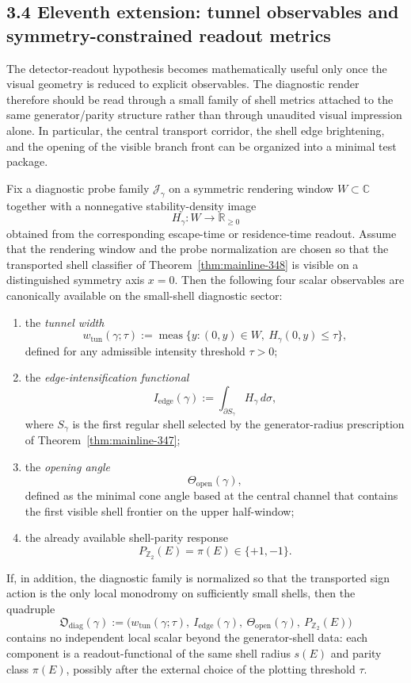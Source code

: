 \subsection*{3.4 Eleventh extension: tunnel observables and symmetry-constrained readout metrics}
The detector-readout hypothesis becomes mathematically useful only once the visual geometry is reduced to explicit observables. The diagnostic render therefore should be read through a small family of shell metrics attached to the same generator/parity structure rather than through unaudited visual impression alone. In particular, the central transport corridor, the shell edge brightening, and the opening of the visible branch front can be organized into a minimal test package.

\begin{proposition}
\label{prop:mainline-3410}
Fix a diagnostic probe family $\mathcal J_\gamma$ on a symmetric rendering window $W\subset\mathbb C$ together with a nonnegative stability-density image
\[
  H_\gamma:W\to\mathbb R_{\ge 0}
\]
obtained from the corresponding escape-time or residence-time readout. Assume that the rendering window and the probe normalization are chosen so that the transported shell classifier of Theorem~\ref{thm:mainline-348} is visible on a distinguished symmetry axis $x=0$. Then the following four scalar observables are canonically available on the small-shell diagnostic sector:
\begin{enumerate}[label=(\roman*)]
  \item the \emph{tunnel width}
  \[
    w_{\mathrm{tun}}(\gamma;\tau)
    :=\operatorname{meas}\bigl\{y:(0,y)\in W,\ H_\gamma(0,y)\le \tau\bigr\},
  \]
  defined for any admissible intensity threshold $\tau>0$;
  \item the \emph{edge-intensification functional}
  \[
    I_{\mathrm{edge}}(\gamma)
    :=\int_{\partial S_\gamma} H_\gamma\,d\sigma,
  \]
  where $S_\gamma$ is the first regular shell selected by the generator-radius prescription of Theorem~\ref{thm:mainline-347};
  \item the \emph{opening angle}
  \[
    \Theta_{\mathrm{open}}(\gamma),
  \]
  defined as the minimal cone angle based at the central channel that contains the first visible shell frontier on the upper half-window;
  \item the already available shell-parity response
  \[
    P_{\mathbb Z_2}(E)=\pi(E)\in\{+1,-1\}.
  \]
\end{enumerate}
If, in addition, the diagnostic family is normalized so that the transported sign action is the only local monodromy on sufficiently small shells, then the quadruple
\[
  \mathfrak O_{\mathrm{diag}}(\gamma)
  :=\bigl(w_{\mathrm{tun}}(\gamma;\tau),\ I_{\mathrm{edge}}(\gamma),\ \Theta_{\mathrm{open}}(\gamma),\ P_{\mathbb Z_2}(E)\bigr)
\]
contains no independent local scalar beyond the generator-shell data: each component is a readout-functional of the same shell radius $s(E)$ and parity class $\pi(E)$, possibly after the external choice of the plotting threshold $\tau$.
\end{proposition}

